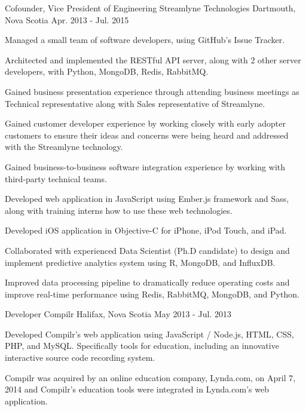 \begin{cventries}
  \cventry
    {Cofounder, Vice President of Engineering} %
    {Streamlyne Technologies}  %
    {Dartmouth, Nova Scotia} %
    {Apr. 2013 - Jul. 2015} %
    {
      \begin{cvitems} %
	\item {Managed a small team of software developers, using GitHub's Issue Tracker.}
	\item {Architected and implemented the RESTful API server, along with 2 other server developers, with Python, MongoDB, Redis, RabbitMQ.}
	\item {Gained business presentation experience through attending business meetings as Technical representative along with Sales representative of Streamlyne.}
	\item {Gained customer developer experience by working closely with early adopter customers to ensure their ideas and concerns were being heard and addressed with the Streamlyne technology.}
	\item {Gained business-to-business software integration experience by working with third-party technical teams.}
	\item {Developed web application in JavaScript using Ember.js framework and Sass, along with training interns how to use these web technologies.}
	\item {Developed iOS application in Objective-C for iPhone, iPod Touch, and iPad.}
	\item {Collaborated with experienced Data Scientist (Ph.D candidate) to design and implement predictive analytics system using R, MongoDB, and InfluxDB.}
	\item {Improved data processing pipeline to dramatically reduce operating costs and improve real-time performance using Redis, RabbitMQ, MongoDB, and Python.}
      \end{cvitems} 
    }

  \cventry
    {Developer} %
    {Compilr} %
    {Halifax, Nova Scotia} %
    {May 2013 - Jul. 2013} %
    {
      \begin{cvitems} %
	\item {Developed Compilr's web application using JavaScript / Node.js, HTML, CSS, PHP, and MySQL. Specifically tools for education, including an innovative interactive source code recording system.}
	\item {Compilr was acquired by an online education company, Lynda.com, on April 7, 2014 and Compilr's education tools were integrated in Lynda.com's web application.}
      \end{cvitems}
    }


\end{cventries}
